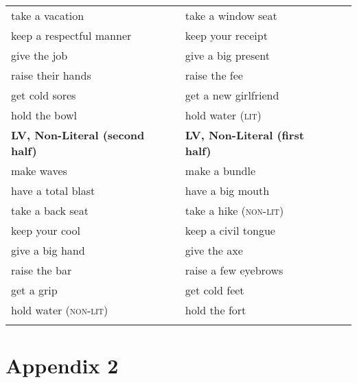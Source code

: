 \begin{table}
\begin{tabular}{lllll}
take a vacation	&&	take a window seat \\
keep a respectful manner &&		keep your receipt \\
give the job    &&		give a big present \\
raise their hands	&&	raise the fee \\
get cold sores	&&	get a new girlfriend \\
hold the bowl	&&	hold water (\textsc{lit}) \\ \midrule
 \textbf{LV, Non-Literal (second half)} &  & \textbf{LV, Non-Literal (first half)} \\
make waves	&&	make a bundle \\
have a total blast	&&	have a big mouth \\
take a back seat	&&	take a hike (\textsc{non-lit}) \\
keep your cool	&&	keep a civil tongue \\
give a big hand	&&	give the axe \\
raise the bar	&&	raise a few eyebrows \\
get a grip	&&	get cold feet \\
hold water (\textsc{non-lit})	&&	hold the fort \\
  \lspbottomrule
 \end{tabular}
\end{table}


\chapter{Appendix 2}


